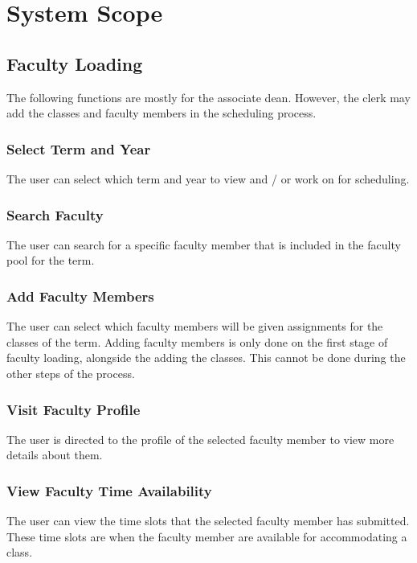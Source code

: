 \section{System Scope}

    \subsection{Faculty Loading}
    The following functions are mostly for the associate dean. However, the clerk may add the classes and faculty members in the scheduling process.
    
        \subsubsection{Select Term and Year}
        The user can select which term and year to view and / or work on for scheduling.
        
        \subsubsection{Search Faculty}
        The user can search for a specific faculty member that is included in the faculty pool for the term.
        
        \subsubsection{Add Faculty Members}
        The user can select which faculty members will be given assignments for the classes of the term. Adding faculty members is only done on the first stage of faculty loading, alongside the adding the classes. This cannot be done during the other steps of the process.
        
        \subsubsection{Visit Faculty Profile}
        The user is directed to the profile of the selected faculty member to view more details about them.

        \subsubsection{View Faculty Time Availability}
        The user can view the time slots that the selected faculty member has submitted. These time slots are when the faculty member are available for accommodating a class.
        
